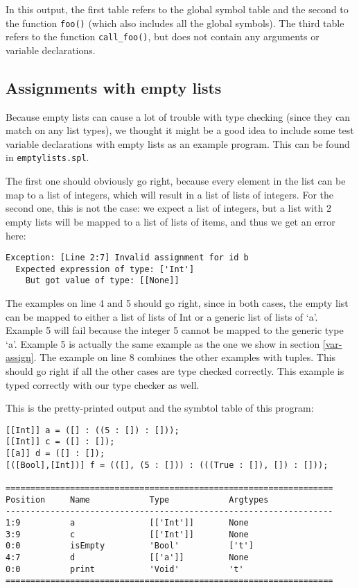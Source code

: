 \documentclass[a4paper]{article}
\begin{document}
In this output, the first table refers to the global symbol table and the second to the function {\tt foo()} (which also includes all the global symbols). The third table refers to the function {\tt call\_foo()}, but does not contain any arguments or variable declarations.

\subsection{Assignments with empty lists}
Because empty lists can cause a lot of trouble with type checking (since they can match on any list types), we thought it might be a good idea to include some test variable declarations with empty lists as an example program. This can be found in {\tt emptylists.spl}. 

The first one should obviously go right, because every element in the list can be map to a list of integers, which will result in a list of lists of integers. For the second one, this is not the case: we expect a list of integers, but a list with 2 empty lists will be mapped to a list of lists of items, and thus we get an error here:
\begin{verbatim}
Exception: [Line 2:7] Invalid assignment for id b
  Expected expression of type: ['Int']
    But got value of type: [[None]]
\end{verbatim}
The examples on line 4 and 5 should go right, since in both cases, the empty list can be mapped to either a list of lists of Int or a generic list of lists of `a'. Example 5 will fail because the integer 5 cannot be mapped to the generic type `a'. Example 5 is actually the same example as the one we show in section \ref{var-assign}. The example on line 8 combines the other examples with tuples. This should go right if all the other cases are type checked correctly. This example is typed correctly with our type checker as well.

This is the pretty-printed output and the symbtol table of this program: 
\begin{verbatim}
[[Int]] a = ([] : ((5 : []) : []));
[[Int]] c = ([] : []);
[[a]] d = ([] : []);
[([Bool],[Int])] f = (([], (5 : [])) : (((True : []), []) : []));

==================================================================
Position     Name            Type            Argtypes            
------------------------------------------------------------------
1:9          a               [['Int']]       None                
3:9          c               [['Int']]       None                
0:0          isEmpty         'Bool'          ['t']               
4:7          d               [['a']]         None                
0:0          print           'Void'          't'                 
==================================================================
\end{verbatim}
\end{document}
